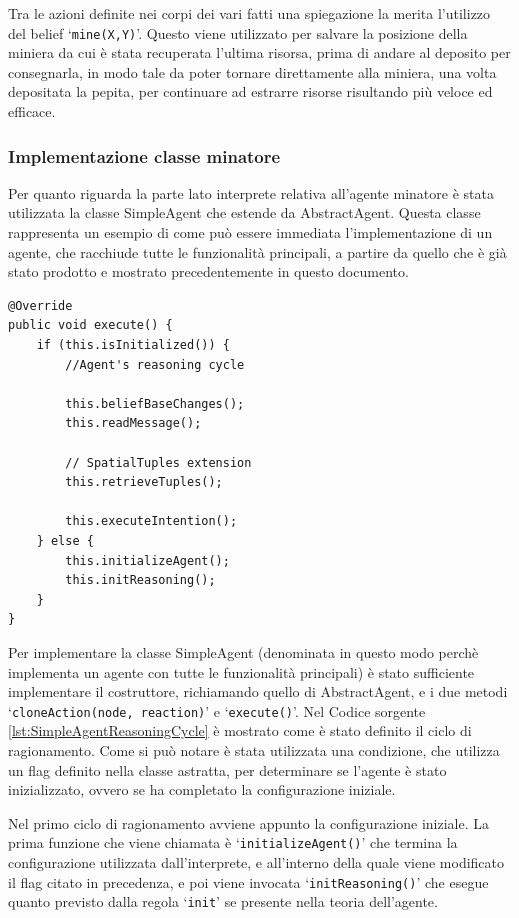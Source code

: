 Tra le azioni definite nei corpi dei vari fatti una spiegazione la merita l'utilizzo del belief `\texttt{mine(X,Y)}'. Questo viene utilizzato per salvare la posizione della miniera da cui è stata recuperata l'ultima risorsa, prima di andare al deposito per consegnarla, in modo tale da poter tornare direttamente alla miniera, una volta depositata la pepita, per continuare ad estrarre risorse risultando più veloce ed efficace.

\subsubsection{Implementazione classe minatore}
Per quanto riguarda la parte lato interprete relativa all'agente minatore è stata utilizzata la classe SimpleAgent che estende da AbstractAgent. Questa classe rappresenta un esempio di come può essere immediata l'implementazione di un agente, che racchiude tutte le funzionalità principali, a partire da quello che è già stato prodotto e mostrato precedentemente in questo documento.

\switchToJava{}{}
\begin{lstlisting}[float,firstnumber=1,label={lst:SimpleAgentReasoningCycle},caption={Ciclo di ragionamento per l'agente completo}]
@Override
public void execute() {
    if (this.isInitialized()) {
        //Agent's reasoning cycle

        this.beliefBaseChanges();
        this.readMessage();

        // SpatialTuples extension
        this.retrieveTuples();

        this.executeIntention();
    } else {
        this.initializeAgent();
        this.initReasoning();
    }
}
\end{lstlisting}

Per implementare la classe SimpleAgent (denominata in questo modo perchè implementa un agente con tutte le funzionalità principali) è stato sufficiente implementare il costruttore, richiamando quello di AbstractAgent, e i due metodi `\texttt{cloneAction(node, reaction)}' e `\texttt{execute()}'.
Nel Codice sorgente \ref{lst:SimpleAgentReasoningCycle} è mostrato come è stato definito il ciclo di ragionamento.
Come si può notare è stata utilizzata una condizione, che utilizza un flag definito nella classe astratta, per determinare se l'agente è stato inizializzato, ovvero se ha completato la configurazione iniziale.

Nel primo ciclo di ragionamento avviene appunto la configurazione iniziale. La prima funzione che viene chiamata è `\texttt{initializeAgent()}' che termina la configurazione utilizzata dall'interprete, e all'interno della quale viene modificato il flag citato in precedenza, e poi viene invocata `\texttt{initReasoning()}' che esegue quanto previsto dalla regola `\texttt{init}' se presente nella teoria dell'agente.

